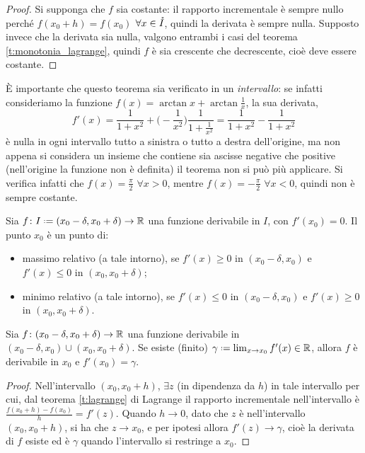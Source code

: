 \begin{proof}
Si supponga che $f$ sia costante: il rapporto incrementale è sempre nullo perché $f(x_0+h)=f(x_0)$ $\forall x\in\mathring{I}$, quindi la derivata è sempre nulla.
Supposto invece che la derivata sia nulla, valgono entrambi i casi del teorema \ref{t:monotonia_lagrange}, quindi $f$ è sia crescente che decrescente, cioè deve essere costante.
\end{proof}
È importante che questo teorema sia verificato in un \emph{intervallo}: se infatti consideriamo la funzione $f(x)=\arctan x+\arctan\frac1{x}$, la sua derivata,
\[
f'(x)=\frac{1}{1+x^2}+\bigg(\!-\frac1{x^2}\bigg)\frac{1}{1+\frac1{x^2}}=\frac{1}{1+x^2}-\frac{1}{1+x^2}
\]
è nulla in ogni intervallo tutto a sinistra o tutto a destra dell'origine, ma non appena si considera un insieme che contiene sia ascisse negative che positive (nell'origine la funzione non è definita) il teorema non si può più applicare. Si verifica infatti che $f(x)=\frac{\pi}2$ $\forall x>0$, mentre $f(x)=-\frac{\pi}2$ $\forall x<0$, quindi non è sempre costante. 
\begin{corollario}
Sia $f\colon I\defeq(x_0-\delta,x_0+\delta)\to\R$ una funzione derivabile in $I$, con $f'(x_0)=0$. Il punto $x_0$ è un punto di:
\begin{itemize}
\item massimo relativo (a tale intorno), se $f'(x)\geq 0$ in $(x_0-\delta,x_0)$ e $f'(x)\leq 0$ in $(x_0,x_0+\delta)$;
\item minimo relativo (a tale intorno), se $f'(x)\leq 0$ in $(x_0-\delta,x_0)$ e $f'(x)\geq 0$ in $(x_0,x_0+\delta)$.
\end{itemize}
\end{corollario}
\begin{teorema} \label{t:derivata_solo_disc_seconda_specie}
Sia $f\colon(x_0-\delta,x_0+\delta)\to\mathbb{R}$ una funzione derivabile in $(x_0-\delta,x_0)\cup(x_0,x_0+\delta)$. Se esiste (finito) $\gamma\defeq\lim_{x\to x_0} f'(x)\in\R$, allora $f$ è derivabile in $x_0$ e $f'(x_0)=\gamma$.
\end{teorema}
\begin{proof}
Nell'intervallo $(x_0,x_0+h)$, $\exists z$ (in dipendenza da $h$) in tale intervallo per cui, dal teorema \ref{t:lagrange} di Lagrange il rapporto incrementale nell'intervallo è $\frac{f(x_0+h)-f(x_0)}{h}=f'(z)$. Quando $h\to 0$, dato che $z$ è nell'intervallo $(x_0,x_0+h)$, si ha che $z\to x_0$, e per ipotesi allora $f'(z)\to\gamma$, cioè la derivata di $f$ esiste ed è $\gamma$ quando l'intervallo si restringe a $x_0$.
\end{proof}

